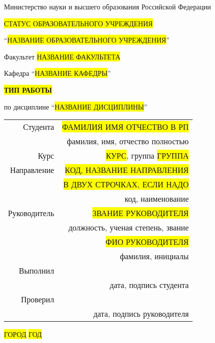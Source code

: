 \thispagestyle{empty}

\begin{center}
    Министерство науки и высшего образования Российской Федерации

    \colorbox{yellow}{СТАТУС ОБРАЗОВАТЕЛЬНОГО УЧРЕЖДЕНИЯ}

    \enquote{\colorbox{yellow}{НАЗВАНИЕ ОБРАЗОВАТЕЛЬНОГО УЧРЕЖДЕНИЯ}}

    \vspace{1cm}
    Факультет \colorbox{yellow}{НАЗВАНИЕ ФАКУЛЬТЕТА}

    Кафедра \enquote{\colorbox{yellow}{НАЗВАНИЕ КАФЕДРЫ}}

    \vspace{4cm}
    \textbf{\colorbox{yellow}{ТИП РАБОТЫ}}

    по дисциплине \enquote{\colorbox{yellow}{НАЗВАНИЕ ДИСЦИПЛИНЫ}}
\end{center}

\vspace{2cm}
\begin{flushright}    
    \begin{tabular}{ r r }
        Студента & \colorbox{yellow}{ФАМИЛИЯ ИМЯ ОТЧЕСТВО В РП} \\
        \cline{2-2}
        & \tiny{фамилия, имя, отчество полностью} \\

        Курс & \colorbox{yellow}{КУРС}, группа \colorbox{yellow}{ГРУППА} \\
        \cline{2-2}
        Направление & \colorbox{yellow}{КОД, НАЗВАНИЕ НАПРАВЛЕНИЯ} \\
        \cline{2-2}
        & \colorbox{yellow}{В ДВУХ СТРОЧКАХ, ЕСЛИ НАДО} \\
        \cline{2-2}
        & \tiny{код, наименование} \\

        Руководитель & \colorbox{yellow}{ЗВАНИЕ РУКОВОДИТЕЛЯ} \\
        \cline{2-2}
        & \tiny{должность, ученая степень, звание} \\
        & \colorbox{yellow}{ФИО РУКОВОДИТЕЛЯ} \\
        \cline{2-2}
        & \tiny{фамилия, инициалы} \\

        Выполнил & \\
        \cline{2-2}
        & \tiny{дата, подпись студента} \\

        Проверил & \\
        \cline{2-2}
        & \tiny{дата, подпись руководителя} \\

    \end{tabular}
\end{flushright}

\vspace*{\fill}
\begin{center}
    \colorbox{yellow}{ГОРОД} \colorbox{yellow}{ГОД}
\end{center}

